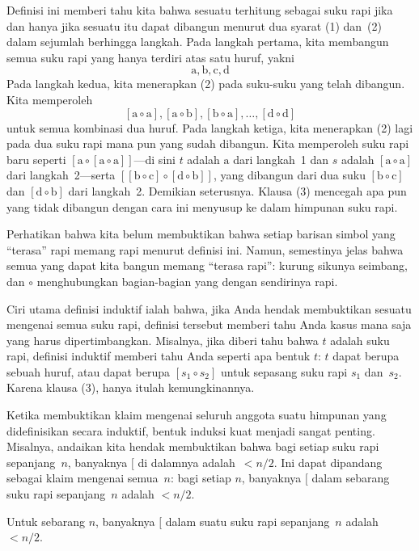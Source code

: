 \documentclass[../../../include/open-logic-section]{subfiles}
\begin{document}
Definisi ini memberi tahu kita bahwa sesuatu terhitung sebagai suku rapi
jika dan hanya jika sesuatu itu dapat dibangun menurut dua syarat (1)
dan~(2) dalam sejumlah berhingga langkah. Pada langkah pertama, kita
membangun semua suku rapi yang hanya terdiri atas satu huruf, yakni
\[
\mathrm{a}, \mathrm{b}, \mathrm{c}, \mathrm{d}
\]
Pada langkah kedua, kita menerapkan (2) pada suku-suku yang telah dibangun.
Kita memperoleh
\[
[\mathrm{a} \circ \mathrm{a}], [\mathrm{a} \circ \mathrm{b}],
[\mathrm{b} \circ \mathrm{a}], \dots, [\mathrm{d} \circ \mathrm{d}]
\]
untuk semua kombinasi dua huruf. Pada langkah ketiga, kita menerapkan (2)
lagi pada dua suku rapi mana pun yang sudah dibangun. Kita memperoleh suku
rapi baru seperti $[\mathrm{a} \circ [\mathrm{a} \circ
    \mathrm{a}]]$---di sini $t$ adalah $\mathrm{a}$ dari langkah~1 dan $s$
adalah $[\mathrm{a} \circ \mathrm{a}]$ dari langkah~2---serta
$[[\mathrm{b} \circ \mathrm{c}] \circ [\mathrm{d} \circ \mathrm{b}]]$,
yang dibangun dari dua suku $[\mathrm{b} \circ \mathrm{c}]$ dan
$[\mathrm{d} \circ \mathrm{b}]$ dari langkah~2. Demikian seterusnya.
Klausa (3) mencegah apa pun yang tidak dibangun dengan cara ini menyusup ke
dalam himpunan suku rapi.

Perhatikan bahwa kita belum membuktikan bahwa setiap barisan simbol yang
``terasa'' rapi memang rapi menurut definisi ini. Namun, semestinya jelas
bahwa semua yang dapat kita bangun memang ``terasa rapi'': kurung sikunya
seimbang, dan $\circ$ menghubungkan bagian-bagian yang dengan sendirinya
rapi.

Ciri utama definisi induktif ialah bahwa, jika Anda hendak membuktikan
sesuatu mengenai semua suku rapi, definisi tersebut memberi tahu Anda kasus
mana saja yang harus dipertimbangkan. Misalnya, jika diberi tahu bahwa $t$
adalah suku rapi, definisi induktif memberi tahu Anda seperti apa bentuk
$t$: $t$ dapat berupa sebuah huruf, atau dapat berupa $[s_1 \circ s_2]$
untuk sepasang suku rapi $s_1$ dan~$s_2$. Karena klausa (3), hanya itulah
kemungkinannya.

Ketika membuktikan klaim mengenai seluruh anggota suatu himpunan yang
didefinisikan secara induktif, bentuk induksi kuat menjadi sangat penting.
Misalnya, andaikan kita hendak membuktikan bahwa bagi setiap suku rapi
sepanjang~$n$, banyaknya $[$ di dalamnya adalah~$< n/2$. Ini dapat
dipandang sebagai klaim mengenai semua~$n$: bagi setiap $n$, banyaknya $[$
dalam sebarang suku rapi sepanjang~$n$ adalah $< n/2$.

\begin{prop}
  Untuk sebarang $n$, banyaknya $[$ dalam suatu suku rapi sepanjang~$n$
  adalah $< n/2$.
\end{prop}
\end{document}

